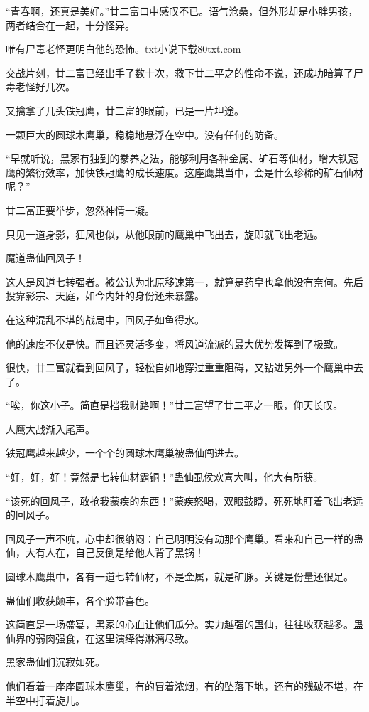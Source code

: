 \begin{this_body}
“青春啊，还真是美好。”廿二富口中感叹不已。语气沧桑，但外形却是小胖男孩，两者结合在一起，十分怪异。

唯有尸毒老怪更明白他的恐怖。txt小说下载80txt.com

交战片刻，廿二富已经出手了数十次，救下廿二平之的性命不说，还成功暗算了尸毒老怪好几次。

又擒拿了几头铁冠鹰，廿二富的眼前，已是一片坦途。

一颗巨大的圆球木鹰巢，稳稳地悬浮在空中。没有任何的防备。

“早就听说，黑家有独到的豢养之法，能够利用各种金属、矿石等仙材，增大铁冠鹰的繁衍效率，加快铁冠鹰的成长速度。这座鹰巢当中，会是什么珍稀的矿石仙材呢？”

廿二富正要举步，忽然神情一凝。

只见一道身影，狂风也似，从他眼前的鹰巢中飞出去，旋即就飞出老远。

魔道蛊仙回风子！

这人是风道七转强者。被公认为北原移速第一，就算是药皇也拿他没有奈何。先后投靠影宗、天庭，如今内奸的身份还未暴露。

在这种混乱不堪的战局中，回风子如鱼得水。

他的速度不仅是快。而且还灵活多变，将风道流派的最大优势发挥到了极致。

很快，廿二富就看到回风子，轻松自如地穿过重重阻碍，又钻进另外一个鹰巢中去了。

“唉，你这小子。简直是挡我财路啊！”廿二富望了廿二平之一眼，仰天长叹。

人鹰大战渐入尾声。

铁冠鹰越来越少，一个个的圆球木鹰巢被蛊仙闯进去。

“好，好，好！竟然是七转仙材霸铜！”蛊仙虱侯欢喜大叫，他大有所获。

“该死的回风子，敢抢我蒙疾的东西！”蒙疾怒喝，双眼鼓瞪，死死地盯着飞出老远的回风子。

回风子一声不吭，心中却很纳闷：自己明明没有动那个鹰巢。看来和自己一样的蛊仙，大有人在，自己反倒是给他人背了黑锅！

圆球木鹰巢中，各有一道七转仙材，不是金属，就是矿脉。关键是份量还很足。

蛊仙们收获颇丰，各个脸带喜色。

这简直是一场盛宴，黑家的心血让他们瓜分。实力越强的蛊仙，往往收获越多。蛊仙界的弱肉强食，在这里演绎得淋漓尽致。

黑家蛊仙们沉寂如死。

他们看着一座座圆球木鹰巢，有的冒着浓烟，有的坠落下地，还有的残破不堪，在半空中打着旋儿。


\end{this_body}
